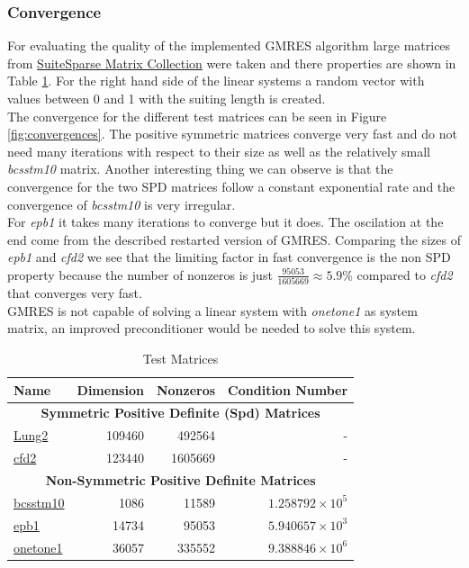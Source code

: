 \documentclass{article}
\begin{document}
\subsubsection{Convergence}
For evaluating the quality of the implemented GMRES algorithm large matrices from \hyperlink{https://sparse.tamu.edu}{SuiteSparse Matrix Collection} were taken and there properties are shown in Table \ref{tab:test-matrices}. For the right hand side of the linear systems a random vector with values between 0 and 1 with the suiting length is created.\\
The convergence for the different test matrices can be seen in Figure \ref{fig:convergences}. The positive symmetric matrices converge very fast and do not need many iterations with respect to their size as well as the relatively small \textit{bcsstm10} matrix. Another interesting thing we can observe is that the convergence for the two SPD matrices follow a constant exponential rate and the convergence of \textit{bcsstm10} is very irregular.\\
For \textit{epb1} it takes many iterations to converge but it does. The oscilation at the end come from the described restarted version of GMRES. Comparing the sizes of \textit{epb1} and \textit{cfd2} we see that the limiting factor in fast convergence is the non SPD property because the number of nonzeros is just $\frac{95053}{1605669}\approx 5.9$\% compared to \textit{cfd2} that converges very fast.\\
GMRES  is not capable of solving a linear system with \textit{onetone1} as system matrix, an improved preconditioner would be needed to solve this system.

\begin{table}[ht]
\centering
\renewcommand{\arraystretch}{1.5}

\begin{tabular}{|l|r|r|r|}
\hline
\rowcolor{gray!20}
\textbf{Name} & \textbf{Dimension} & \textbf{Nonzeros} & \textbf{Condition Number} \\
\hline
\multicolumn{4}{|c|}{\textbf{Symmetric Positive Definite (Spd) Matrices}} \\
\hline
\hyperlink{https://sparse.tamu.edu/Norris/lung2}{Lung2} & 109460 & 492564 & - \\
\hline
\hyperlink{https://sparse.tamu.edu/Rothberg/cfd2}{cfd2} & 123440 & 1605669 & - \\
\hline
\multicolumn{4}{|c|}{\textbf{Non-Symmetric Positive Definite Matrices}} \\
\hline
\hyperlink{https://sparse.tamu.edu/HB/bcsstm10}{bcsstm10} & 1086 & 11589 & $1.258792 \times 10^{5}$ \\
\hline
\hyperlink{https://sparse.tamu.edu/Averous/epb1}{epb1} & 14734 & 95053 & $5.940657 \times 10^{3}$ \\
\hline
\hyperlink{https://sparse.tamu.edu/ATandT/onetone1}{onetone1} & 36057 & 335552 & $9.388846 \times 10^{6}$ \\
\hline
\end{tabular}
\caption{Test Matrices}
\label{tab:test-matrices}
\end{table}
\end{document}
